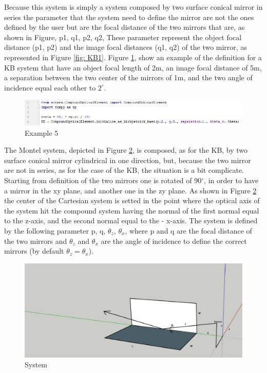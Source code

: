 Because this system is simply a system composed by two surface conical mirror in series the parameter that the system need to define the mirror are not the ones defined by the user but are the focal distance of the two mirrors that are, as shown in Figure, p1, q1, p2, q2, These parameter represent the object focal distance (p1, p2) and the image focal distances (q1, q2) of the two mirror, as represented in Figure \ref{fig: KB1}. Figure \ref{fig: CodeKB}, show an example of the definition for a KB system that have an object focal length of 2m, an image focal distance of 5m, a separation between the two center of the mirrors of 1m, and the two angle of incidence equal each other to $2^{\circ} $.
\begin{figure}[H]
%
\centering
%
\includegraphics[width=1.\textwidth]{Immagini/Chapter3/CodeKB}
%
\caption{Example 5}
%
\label{fig: CodeKB}
%
\end{figure}
The Montel system, depicted in Figure \ref{fig: MontelSystem}, is composed, as for the KB, by two surface conical mirror cylindrical in one direction, but, because the two mirror are not in series, as for the case of the KB, the situation is a bit complicate. Starting from definition of the two mirrors one is rotated of 90$^\circ $, in order to have a mirror in the xy plane, and another one in the zy plane. As shown in Figure \ref{fig: MontelSystem} the center of the Cartesian system is setted in the point where the  optical axis of the system hit the compound system having the normal of the first normal equal to the z-axis, and the second normal equal to the - x-axis. The system is defined by the following parameter p, q, $\theta_z $, $\theta_x $, where p and q are the focal distance of the two mirrors and $\theta_z $ and $\theta_x $ are the angle of incidence to define the correct mirrors  (by default $\theta_z = \theta_x $).
\begin{figure}[H]
%
\centering
%
\includegraphics[width=1.\textwidth]{Immagini/Chapter3/MontelSystem2}
%
\caption{System}
%
\label{fig: MontelSystem}
%
\end{figure}
